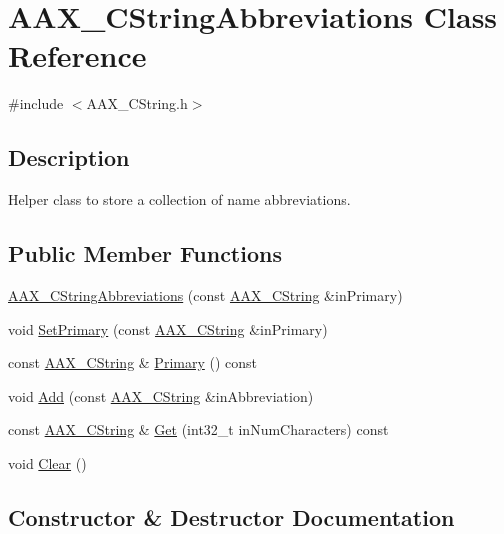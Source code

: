 \hypertarget{a00043}{}\section{A\+A\+X\+\_\+\+C\+String\+Abbreviations Class Reference}
\label{a00043}


{\ttfamily \#include $<$A\+A\+X\+\_\+\+C\+String.\+h$>$}



\subsection{Description}
Helper class to store a collection of name abbreviations. \subsection*{Public Member Functions}
\begin{DoxyCompactItemize}
\item 
\hyperlink{a00043_a318a77942cf3963f2eda432ba4e1d759}{A\+A\+X\+\_\+\+C\+String\+Abbreviations} (const \hyperlink{a00042}{A\+A\+X\+\_\+\+C\+String} \&in\+Primary)
\item 
void \hyperlink{a00043_adab8aa7dbc6c1cc8d9d4e8702a55f149}{Set\+Primary} (const \hyperlink{a00042}{A\+A\+X\+\_\+\+C\+String} \&in\+Primary)
\item 
const \hyperlink{a00042}{A\+A\+X\+\_\+\+C\+String} \& \hyperlink{a00043_aef56288d804f7be4ae8e2ccfb79a98f6}{Primary} () const 
\item 
void \hyperlink{a00043_a840d1e71735c21a38136812a01693f91}{Add} (const \hyperlink{a00042}{A\+A\+X\+\_\+\+C\+String} \&in\+Abbreviation)
\item 
const \hyperlink{a00042}{A\+A\+X\+\_\+\+C\+String} \& \hyperlink{a00043_a40f7bf706c895ea4da89635ae954aa7b}{Get} (int32\+\_\+t in\+Num\+Characters) const 
\item 
void \hyperlink{a00043_a6f909da041fa1bd21dfa28f1e384417e}{Clear} ()
\end{DoxyCompactItemize}


\subsection{Constructor \& Destructor Documentation}
\hypertarget{a00043_a318a77942cf3963f2eda432ba4e1d759}{}
